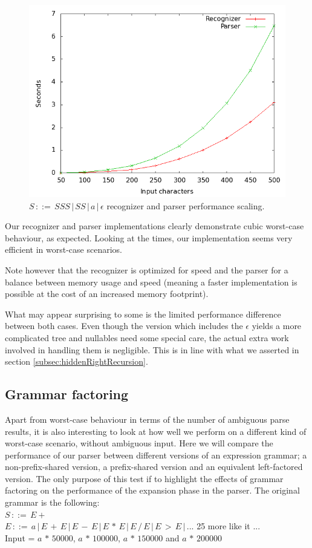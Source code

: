 \documentclass[a4paper,10pt]{article}
\begin{document}
\begin{figure}[H]
\centering
\includegraphics[scale=0.4]{worst-case_with-epsilon.png}
\caption{$S\,::=\,SSS\,|\,SS\,|\,a\,|\,\epsilon$ recognizer and parser performance scaling.}
\end{figure}

Our recognizer and parser implementations clearly demonstrate cubic worst-case behaviour, as expected. Looking at the times, our implementation seems very efficient in worst-case scenarios.

Note however that the recognizer is optimized for speed and the parser for a balance between memory usage and speed (meaning a faster implementation is possible at the cost of an increased memory footprint).

What may appear surprising to some is the limited performance difference between both cases. Even though the version which includes the $\epsilon$ yields a more complicated tree and nullables need some special care, the actual extra work involved in handling them is negligible. This is in line with what we asserted in section \ref{subsec:hiddenRightRecursion}.

\subsection{Grammar factoring}
\label{sec:factoringBenchmark}

Apart from worst-case behaviour in terms of the number of ambiguous parse results, it is also interesting to look at how well we perform on a different kind of worst-case scenario, without ambiguous input. Here we will compare the performance of our parser between different versions of an expression grammar; a non-prefix-shared version, a prefix-shared version and an equivalent left-factored version. The only purpose of this test if to highlight the effects of grammar factoring on the performance of the expansion phase in the parser. The original grammar is the following:\\
$S\,::=\,E+$\\
$E\,::=\,a\,|\,E\,+\,E\,|\,E\,-\,E\,|\,E\,*\,E\,|\,E\,/\,E\,|\,E\,>\,E\,|\,...$ 25 more like it ...\\
Input = $a\,*\,50000$, $a\,*\,100000$, $a\,*\,150000$ and $a\,*\,200000$
\end{document}

